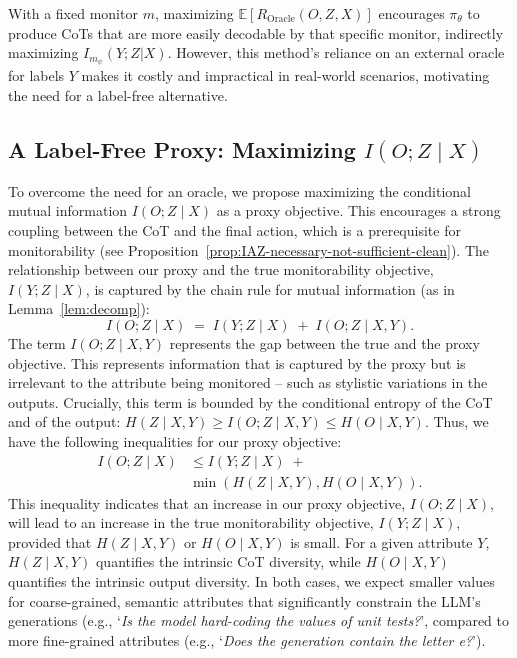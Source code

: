 \documentclass{article}
\theoremstyle{plain}
\newcommand{\OR}{R_{\mathrm{Oracle}}}
\begin{document}
With a fixed monitor $m$, maximizing \(\mathbb{E}[\OR(O, Z, X)]\) encourages \(\pi_\theta\) to produce CoTs that are more easily decodable by that specific monitor, 
indirectly maximizing $I_{m_{\psi}}(Y;Z|X)$.
However, this method's reliance on an external oracle for labels $Y$ makes it costly and impractical in real-world scenarios, motivating the need for a label-free alternative.

\subsection{A Label-Free Proxy: Maximizing \(I(O;Z\mid X)\)}
\label{subsec:proxy}
To overcome the need for an oracle, we propose maximizing the conditional mutual information $I(O;Z\mid X)$ as a proxy objective.
This encourages a strong coupling between the CoT and the final action, which is a prerequisite for monitorability (see Proposition~\ref{prop:IAZ-necessary-not-sufficient-clean}). The relationship between our proxy and the true monitorability objective, $I(Y;Z \mid X)$, 
is captured by the chain rule for mutual information (as in Lemma~\ref{lem:decomp}):
% 
\begin{equation}
  \label{eq:IAZ-decomp} 
  I(O;Z\mid X)\;=\;I(Y;Z\mid X)\;+\;I(O;Z\mid X,Y). 
\end{equation} 
% 
The term $I(O;Z \mid X,Y)$ represents the gap between the true and the proxy objective. This represents information that is captured by the proxy but is irrelevant to the attribute being monitored -- such as stylistic variations in the outputs.
Crucially, this term is bounded by the conditional entropy of the CoT and of the output: $H(Z\mid X, Y) \geq I(O;Z \mid X,Y) \leq H(O \mid X,Y)$.
Thus, we have the following inequalities for our proxy objective:
\begin{align*}
I(O;Z\mid X) &\le I(Y;Z\mid X)\;
+ \\
&\min(H(Z\mid X,Y),H(O\mid X,Y)).
\end{align*}
This inequality indicates that an increase in our proxy objective, \(I(O;Z\mid X)\), 
will lead to an increase in the true monitorability objective, \(I(Y;Z\mid X)\), 
provided that \(H(Z\mid X,Y)\) or \(H(O\mid X,Y)\) is small.
For a given attribute $Y$, $H(Z \mid X,Y)$ quantifies the intrinsic CoT diversity, while $H(O \mid X,Y)$ quantifies the intrinsic output diversity.
In both cases, we expect smaller values for coarse-grained, semantic attributes that significantly constrain the LLM's generations (e.g., `\textit{Is the model hard-coding the values of unit tests?}', compared to more fine-grained attributes (e.g., `\textit{Does the generation contain the letter \emph{e}?}').
\end{document}
